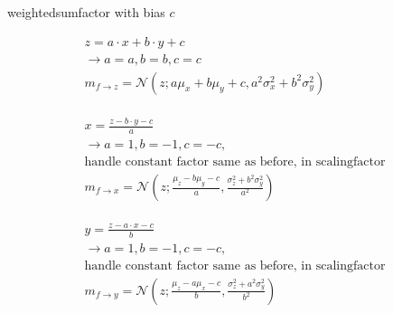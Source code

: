 \documentclass{article}
\begin{document}
\hrulefill

weightedsumfactor with bias $c$

\begin{align*}
    z = a \cdot x + b \cdot y + c \\
    \rightarrow a = a, b = b, c = c\\
    m_{f \rightarrow z} = \mathcal{N}(z; a\mu_x + b\mu_y + c, a^2 \sigma_x^2 + b^2 \sigma_y^2)\\\\
    \\\\
    x = \frac{z - b \cdot y - c}{a}\\
    \rightarrow a = 1, b = -1, c = - c, \\\text{handle constant factor same as before, in scalingfactor}\\
    m_{f \rightarrow x} = \mathcal{N}(z; \frac{\mu_z - b\mu_y - c}{a}, \frac{\sigma_z^2 + b^2 \sigma_y^2}{a^2})\\\\
    \\\\
    y = \frac{z - a \cdot x - c}{b}\\
    \rightarrow a = 1, b = -1, c = - c, \\\text{handle constant factor same as before, in scalingfactor}\\
    m_{f \rightarrow y} = \mathcal{N}(z; \frac{\mu_z - a\mu_x - c}{b}, \frac{\sigma_z^2 + a^2 \sigma_y^2}{b^2})\\\\
\end{align*}
\end{document}
